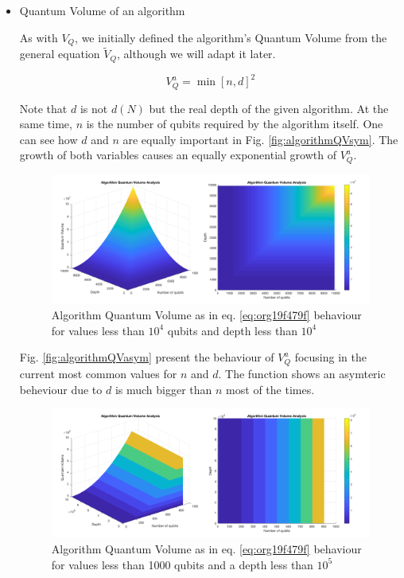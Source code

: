 \begin{itemize}
\begin{itemize}
\begin{itemize}
\item Quantum Volume of an algorithm
\label{sec:orgbc92c41}

As with \(V_Q\), we initially defined the algorithm's Quantum Volume from the general equation \(\tilde{V}_Q\), although we will adapt it later.

\begin{equation}
\label{eq:org19f479f}
V_Q^a = \min \left[ n,d \right]^2
\end{equation}

Note that \(d\) is not \(d(N)\) but the real depth of the given algorithm.
At the same time, \(n\) is the number of qubits required by the algorithm itself.
One can see how \(d\) and \(n\) are equally important in Fig. \ref{fig:algorithmQVsym}.
The growth of both variables causes an equally exponential growth of \(V^a_Q\).

\begin{figure}[htbp]
\centering
\includegraphics[width=\textwidth]{figures/V_q_analysis_sym.png}
\caption{\label{fig:orgefc2aed}
Algorithm Quantum Volume as in eq. \ref{eq:org19f479f} behaviour for values less than \(10^{4}\) qubits and depth less than \(10^{4}\)}
\end{figure}

Fig. \ref{fig:algorithmQVasym} present the behaviour of \(V_Q^a\)
focusing in the current most common values for \(n\) and \(d\).
The function shows an asymteric beheviour due to \(d\) is much bigger than \(n\) most of the times.


\begin{figure}[htbp]
\centering
\includegraphics[width=\textwidth]{figures/V_q_analysis_asym.png}
\caption{\label{fig:orgcf9b322}
Algorithm Quantum Volume as in eq. \ref{eq:org19f479f} behaviour for values less than 1000 qubits and a depth less than \(10^{5}\)}
\end{figure}


\end{itemize}
\end{itemize}
\end{itemize}
